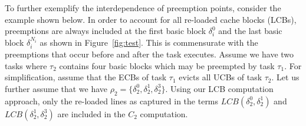 %
%
%
%
%
%
%
%
\newline
\indent
To further exemplify the interdependence of preemption points, consider the example shown below.  In order to account for all re-loaded cache blocks (LCBs), preemptions are always included at the first basic block  ${\delta_i^{0}}$ and the last basic block ${\delta_i^{N_i}}$ as shown in Figure~\ref{fig:test}.  This is commensurate with the preemptions that occur before and after the task executes.  Assume we have two tasks where ${\tau_2}$ contains four basic blocks which may be preempted by task ${\tau_1}$.  For simplification, assume that the ECBs of task ${\tau_1}$ evicts all UCBs of task ${\tau_2}$.  Let us further assume that we have ${\rho_2 = \{\delta_2^0, \delta_2^1, \delta_2^3\}}$.  Using our LCB computation approach, only the re-loaded lines as captured in the terms ${LCB(\delta_2^0, \delta_2^1)}$ and ${LCB(\delta_2^1, \delta_2^3)}$ are included in the ${C_2}$ computation.  
